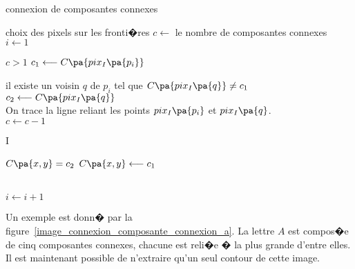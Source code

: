 \begin{xalgorithm}{connexion de composantes connexes}
            \begin{xalgostep}{choix des pixels sur les fronti�res}
                    $c \longleftarrow $ le nombre de composantes connexes \\
                    $i \longleftarrow 1 $\\
                    \begin{xwhile}{$c > 1$}
                       $c_1 \longleftarrow C\pa{pix_I\pa{p_i}}$ \\
                       \begin{xif}{ il existe un voisin $q$ de $p_i$ tel que $C\pa{pix_I\pa{q}} \neq c_1$}
                               $c_2 \longleftarrow C\pa{pix_I\pa{q}}$ \\
                               On trace la ligne reliant les points $pix_I\pa{p_i}$ et $pix_I\pa{q}$. \\
                               $c \longleftarrow c-1$ \\
                               \begin{xforeach}{}{I}
                                   \begin{xif}{$C\pa{x,y} = c_2$}
                                       $C\pa{x,y} \longleftarrow c_1$ 
                                   \end{xif}
                             \end{xforeach}
                       \end{xif} \\
                       $i \longleftarrow i + 1$
                    \end{xwhile}
            \end{xalgostep}
            \end{xalgorithm}



Un exemple est donn� par la figure~\ref{image_connexion_composante_connexion_a}. La lettre $A$ est compos�e de cinq composantes connexes, chacune est reli�e � la plus grande d'entre elles. Il est maintenant possible de n'extraire qu'un seul contour de cette image.




